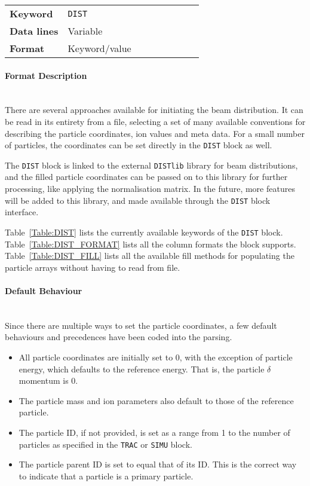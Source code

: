 \bigskip
\begin{tabular}{@{}lp{0.7\linewidth}}
    \textbf{Keyword}    & \texttt{DIST}\index{DIST} \\
    \textbf{Data lines} & Variable \\
    \textbf{Format}     & Keyword/value
\end{tabular}

\paragraph{Format Description}~\\

There are several approaches available for initiating the beam distribution.
It can be read in its entirety from a file, selecting a set of many available conventions for describing the particle coordinates, ion values and meta data.
For a small number of particles, the coordinates can be set directly in the \texttt{DIST} block as well.

The \texttt{DIST} block is linked to the external \texttt{DISTlib} library for beam distributions, and the filled particle coordinates can be passed on to this library for further processing, like applying the normalisation matrix.
In the future, more features will be added to this library, and made available through the \texttt{DIST} block interface.

Table~\ref{Table:DIST} lists the currently available keywords of the \texttt{DIST} block.
Table~\ref{Table:DIST_FORMAT} lists all the column formats the block supports.
Table~\ref{Table:DIST_FILL} lists all the available fill methods for populating the particle arrays without having to read from file.

\paragraph{Default Behaviour}~\\

Since there are multiple ways to set the particle coordinates, a few default behaviours and precedences have been coded into the parsing.

\begin{itemize}
    \item All particle coordinates are initially set to 0, with the exception of particle energy, which defaults to the reference energy. That is, the particle $\delta$ momentum is 0.
    \item The particle mass and ion parameters also default to those of the reference particle.
    \item The particle ID, if not provided, is set as a range from 1 to the number of particles as specified in the \texttt{TRAC} or \texttt{SIMU} block.
    \item The particle parent ID is set to equal that of its ID. This is the correct way to indicate that a particle is a primary particle.
\end{itemize}

